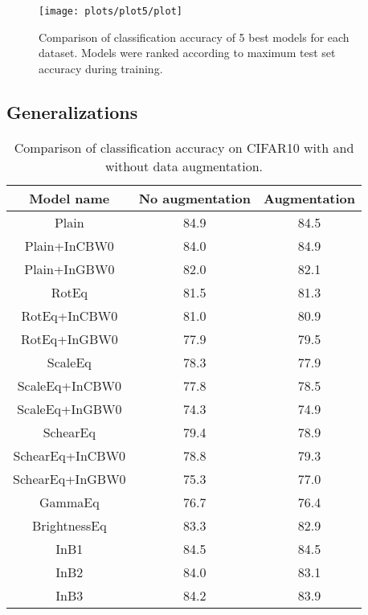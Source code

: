 
    \begin{figure}[h!]
        \centering
        \texttt{[image: plots/plot5/plot]}
        \caption{Comparison of classification accuracy of
            5 best models for each dataset.
            Models were ranked according to maximum test set accuracy during
            training.}
        \label{fig:plot5}
    \end{figure}

    \clearpage
    \subsection{Generalizations}
        \begin{table}
        \centering
        \begin{tabular}{|c|c|c|}
         \hline
         \textbf{Model name} & \textbf{No augmentation} &
         \textbf{Augmentation} \\
         \hline
            Plain & {84.9} & {84.5} \\
            Plain+InCBW0 & {84.0} & {84.9} \\
            Plain+InGBW0 & {82.0} & {82.1} \\
            RotEq & {81.5} & {81.3} \\
            RotEq+InCBW0 & {81.0} & {80.9} \\
            RotEq+InGBW0 & {77.9} & {79.5} \\
            ScaleEq & {78.3} & {77.9} \\
            ScaleEq+InCBW0 & {77.8} & {78.5} \\
            ScaleEq+InGBW0 & {74.3} & {74.9} \\
            SchearEq & {79.4} & {78.9} \\
            SchearEq+InCBW0 & {78.8} & {79.3} \\
            SchearEq+InGBW0 & {75.3} & {77.0} \\
            GammaEq & {76.7} & {76.4} \\
            BrightnessEq & {83.3} & {82.9} \\
            InB1 & {84.5} & {84.5} \\
            InB2 & {84.0} & {83.1} \\
            InB3 & {84.2} & {83.9} \\
         \hline
        \end{tabular}
        \caption{Comparison of classification accuracy on CIFAR10 with and without
            data augmentation.}
        \label{tab:jitter_table}
        \end{table}

